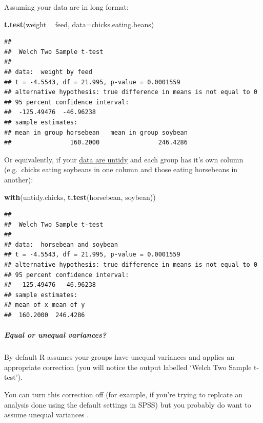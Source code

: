 \documentclass[]{article}
\newenvironment{Shaded}{\begin{snugshade}}{\end{snugshade}}
\newcommand{\KeywordTok}[1]{\textcolor[rgb]{0.13,0.29,0.53}{\textbf{#1}}}
\newcommand{\DataTypeTok}[1]{\textcolor[rgb]{0.13,0.29,0.53}{#1}}
\newcommand{\StringTok}[1]{\textcolor[rgb]{0.31,0.60,0.02}{#1}}
\newcommand{\OperatorTok}[1]{\textcolor[rgb]{0.81,0.36,0.00}{\textbf{#1}}}
\newcommand{\NormalTok}[1]{#1}
\let\oldsubparagraph\subparagraph
\renewcommand{\subparagraph}[1]{\oldsubparagraph{#1}\mbox{}}
\theoremstyle{definition}
\theoremstyle{definition}
\theoremstyle{definition}
\theoremstyle{remark}
\begin{document}
Assuming your data are in long format:

\begin{Shaded}
\begin{Highlighting}[]
\KeywordTok{t.test}\NormalTok{(weight }\OperatorTok{~}\StringTok{ }\NormalTok{feed, }\DataTypeTok{data=}\NormalTok{chicks.eating.beans)}
\end{Highlighting}
\end{Shaded}

\begin{verbatim}
## 
##  Welch Two Sample t-test
## 
## data:  weight by feed
## t = -4.5543, df = 21.995, p-value = 0.0001559
## alternative hypothesis: true difference in means is not equal to 0
## 95 percent confidence interval:
##  -125.49476  -46.96238
## sample estimates:
## mean in group horsebean   mean in group soybean 
##                160.2000                246.4286
\end{verbatim}

Or equivalently, if your \protect\hyperlink{tidying-data}{data are
untidy} and each group has it's own column (e.g.~chicks eating soybeans
in one column and those eating horsebeans in another):

\begin{Shaded}
\begin{Highlighting}[]
\KeywordTok{with}\NormalTok{(untidy.chicks, }\KeywordTok{t.test}\NormalTok{(horsebean, soybean))}
\end{Highlighting}
\end{Shaded}

\begin{verbatim}
## 
##  Welch Two Sample t-test
## 
## data:  horsebean and soybean
## t = -4.5543, df = 21.995, p-value = 0.0001559
## alternative hypothesis: true difference in means is not equal to 0
## 95 percent confidence interval:
##  -125.49476  -46.96238
## sample estimates:
## mean of x mean of y 
##  160.2000  246.4286
\end{verbatim}

\subparagraph{Equal or unequal variances?}\label{equal-variances}

By default R assumes your groups have unequal variances and applies an
appropriate correction (you will notice the output labelled `Welch Two
Sample t-test').

You can turn this correction off (for example, if you're trying to
replcate an analysis done using the default settings in SPSS) but you
probably do want to assume unequal variances
\citep[see][]{ruxton2006unequal}.
\end{document}
